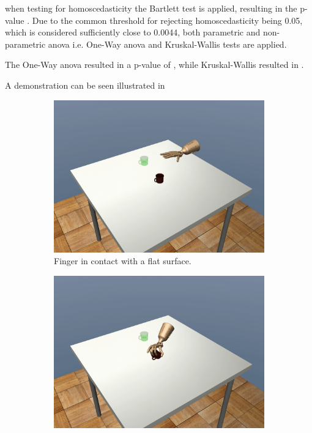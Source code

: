 when testing for homoscedasticity the Bartlett test is applied, resulting in the p-value . Due to the common threshold for rejecting homoscedasticity being \num{0.05}, which is considered sufficiently close to \num{0.0044}, both parametric and non-parametric \gls{anova} i.e. One-Way \gls{anova} and Kruskal-Wallis tests are applied. \medskip

The One-Way \gls{anova} resulted in a p-value of , while Kruskal-Wallis resulted in .

A demonstration can be seen illustrated in~

\begin{figure}[!h]
	\centering
	\begin{subfigure}[b]{0.32\textwidth}
		\centering
		\includegraphics[width=\textwidth]{chapters/3-in-hand-manipulation/fig/frame_10.png}
		\caption{Finger in contact with a flat surface.}
		\label{fig:ai-frame-1}
	\end{subfigure}
	\hfill
	\begin{subfigure}[b]{0.32\textwidth}
		\centering
		\includegraphics[width=\textwidth]{chapters/3-in-hand-manipulation/fig/frame_21.png}

\end{subfigure}
\end{figure}
